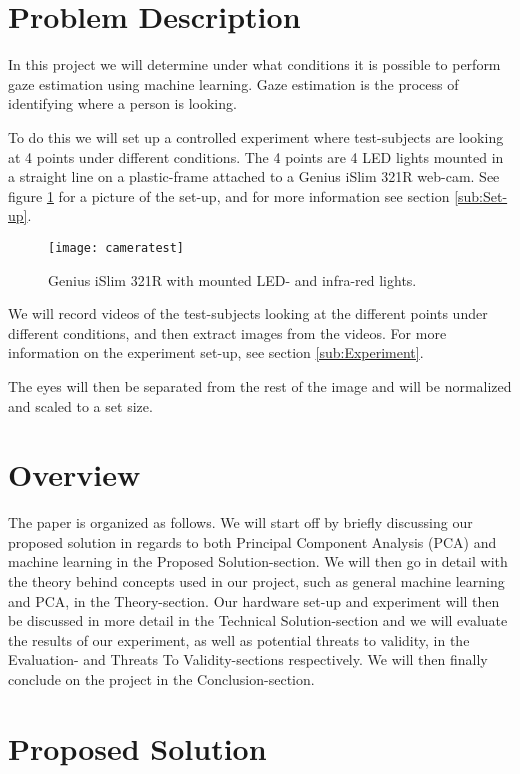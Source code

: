 \section{Problem Description}
In this project we will determine under what conditions it is possible to perform gaze estimation using machine learning.
Gaze estimation is the process of identifying where a person is looking.

To do this we will set up a controlled experiment where test-subjects are looking at 4 points under different conditions.
The 4 points are 4 LED lights mounted in a straight line on a plastic-frame attached to a Genius iSlim 321R web-cam.
See figure \ref{fig:webcamsetup} for a picture of the set-up, and for more information see section \ref{sub:Set-up}.

\begin{figure}[h!]
\centering
\texttt{[image: cameratest]}
\caption{Genius iSlim 321R with mounted LED- and infra-red lights.}
\label{fig:webcamsetup}
\end{figure}

We will record videos of the test-subjects looking at the different points under different conditions, and then extract images from the videos.
For more information on the experiment set-up, see section \ref{sub:Experiment}.

The eyes will then be separated from the rest of the image and will be normalized and scaled to a set size.

\section{Overview}
The paper is organized as follows. We will start off by briefly discussing our proposed solution in regards to both Principal Component Analysis (PCA) and machine learning in the Proposed Solution-section.
We will then go in detail with the theory behind concepts used in our project, such as general machine learning and PCA, in the Theory-section. 
Our hardware set-up and experiment will then be discussed in more detail in the Technical Solution-section and we will evaluate the results of our experiment, as well as potential threats to validity, in the Evaluation- and Threats To Validity-sections respectively. 
We will then finally conclude on the project in the Conclusion-section.

\section{Proposed Solution}
